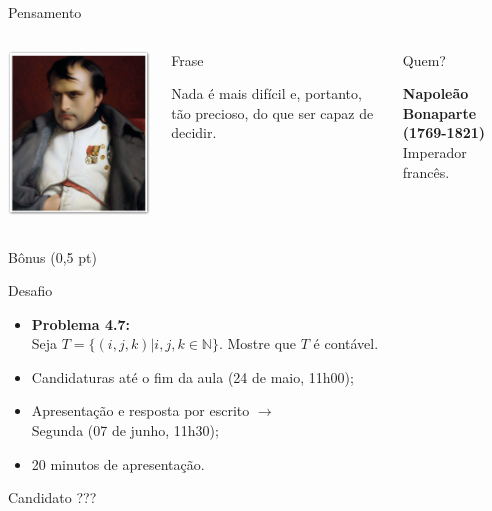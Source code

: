 \documentclass[xcolor=dvipsnames,table]{beamer}
\begin{document}
	\begin{frame}{Pensamento}
		\begin{columns}
		  		\begin{center}
		    		\includegraphics[height=.6\textheight]{images/bonaparte.jpg}
		  		\end{center}
				\begin{block}{Frase}
					\begin{center}
						{\large Nada é mais difícil e, portanto, tão precioso, do que ser capaz de decidir.}
					\end{center}
				\end{block}		  		
		  		\begin{block}{Quem?}
		  			\begin{center}
						{\bf Napoleão Bonaparte (1769-1821)} \\ Imperador francês.
					\end{center}
				\end{block}
		\end{columns}
	\end{frame}
	
	\begin{frame}{Bônus (0,5 pt)}
		\begin{block}{Desafio}
			\begin{itemize}
				\item {\bf Problema 4.7:} \\Seja $T=\{ (i,j,k) | i, j, k \in \mathbb{N} \}$. Mostre que $T$ é contável.
                \item Candidaturas até o fim da aula (24 de maio, 11h00); 
                \item Apresentação e resposta por escrito $\rightarrow$ \\Segunda (07 de junho, 11h30); 
                \item 20 minutos de apresentação.
			\end{itemize}
		\end{block} 
        \begin{block}{Candidato}
        	???
        \end{block}
	\end{frame}
\end{document}
